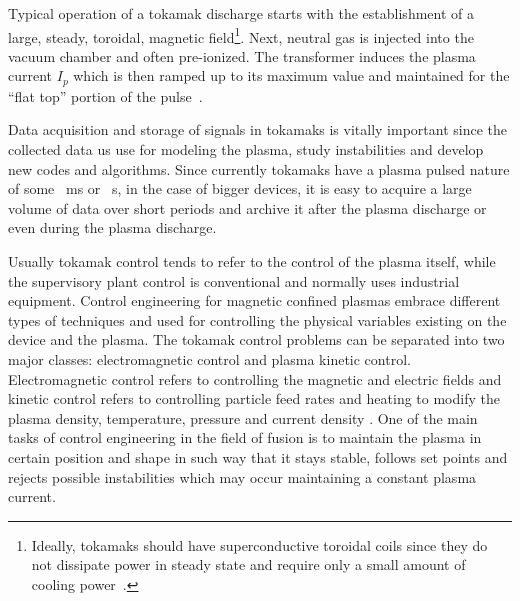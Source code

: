 Typical operation of a tokamak discharge starts with the establishment of a large, steady, toroidal, magnetic field\footnote{Ideally, tokamaks should have superconductive toroidal coils since they do not dissipate power in steady state and require only a small amount of cooling power~\cite[Chapter~5]{Freidberg2007}.}. Next, neutral gas is injected into the vacuum chamber and often pre-ionized. The transformer induces the plasma current $I_p$ which is then ramped up to its maximum value and maintained for the “flat top” portion of the pulse~\cite[Chapter~13]{Freidberg2007}. \smallskip

Data acquisition and storage of signals in tokamaks is vitally important since the collected data us use for modeling the plasma, study instabilities and develop new codes and algorithms. Since currently tokamaks have a plasma pulsed nature of some ~ms or ~s, in the case of bigger devices, it is easy to acquire a large volume of data over short periods and archive it after the plasma discharge or even during the plasma discharge. \smallskip

Usually tokamak control tends to refer to the control of the plasma itself, while the supervisory plant control is conventional and normally uses industrial equipment. Control engineering for magnetic confined plasmas  embrace different types of techniques and used for  controlling the  physical variables existing on the device and the plasma. The tokamak control problems can be separated into two major classes: electromagnetic control and plasma kinetic control. Electromagnetic control refers to controlling the magnetic and electric fields and kinetic control refers to controlling particle feed rates and heating to modify the plasma density, temperature, pressure and current density \cite[Chapter~1]{PirontiBook}.  One of the main tasks of control engineering in the field of fusion is to maintain the plasma in certain position and shape in such way that it stays stable, follows set points and rejects possible instabilities which may occur maintaining a constant plasma current. \smallskip


